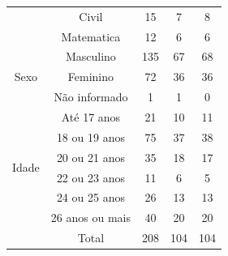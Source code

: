 \begin{table}[ht]
\begin{tabular}{ccccc}
                                        & Civil                    & 15                                        & 7                    & 8                               \\
                                        & Matematica               & 12                                        & 6                    & 6                               \\
  \hline
  \multirow{3}{*}{Sexo}                 & Masculino                & 135                                       & 67                   & 68                              \\
                                        & Feminino                 & 72                                        & 36                   & 36                              \\
                                        & Não informado            & 1                                         & 1                    & 0                               \\
  \hline
  \multirow{6}{*}{Idade}                & Até 17 anos              & 21                                        & 10                   & 11                              \\
                                        & 18 ou 19 anos            & 75                                        & 37                   & 38                              \\
                                        & 20 ou 21 anos            & 35                                        & 18                   & 17                              \\
                                        & 22 ou 23 anos            & 11                                        & 6                    & 5                               \\
                                        & 24 ou 25 anos            & 26                                        & 13                   & 13                              \\
                                        & 26 anos ou mais          & 40                                        & 20                   & 20                              \\
  \hline
                                        & Total                    & 208                                       & 104                  & 104                             \\
\end{tabular}
\end{table}


